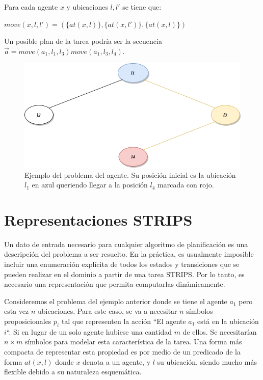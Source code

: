 Para cada agente $x$ y ubicaciones $l, l'$ se tiene que:
\begin{center}
    $move(x, l, l') = (\{at(x, l)\}, \{at(x, l')\}, \{at(x, l)\})$
\end{center}

Un posible plan de la tarea podría ser la secuencia $\vec{a} = move(a_1, l_1,
l_3)move(a_1, l_3, l_4)$.

\begin{figure}
    \centering
    \includegraphics[scale=0.5]{figures/agent_example.png}
    \caption{Ejemplo del problema del agente. Su posición inicial es la
             ubicación $l_1$ en azul queriendo llegar a la posición $l_4$ marcada
             con rojo.}
    \label{fig:agent_example}
\end{figure}

\section{Representaciones STRIPS}

Un dato de entrada necesario para cualquier algoritmo de planificación es una
descripción del problema a ser resuelto. En la práctica, es usualmente imposible
incluir una enumeración explícita de todos los estados y transiciones que se
pueden realizar en el dominio a partir de una tarea STRIPS. Por lo tanto, es
necesario una representación que permita computarlas dinámicamente.

Consideremos el problema del ejemplo anterior donde se tiene el agente $a_1$
pero esta vez $n$ ubicaciones. Para este caso, se va a necesitar $n$ símbolos
proposicionales $p_i$ tal que representen la acción ``El agente $a_1$ está en la
ubicación $i$``. Si en lugar de un solo agente hubiese una cantidad $m$ de
ellos. Se necesitarían $n \times m$ símbolos para modelar esta característica de
la tarea. Una forma más compacta de representar esta propiedad es por medio de
un predicado de la forma $at(x, l)$ donde $x$ denota a un agente, y $l$ su
ubicación, siendo mucho más flexible debido a su naturaleza esquemática.

